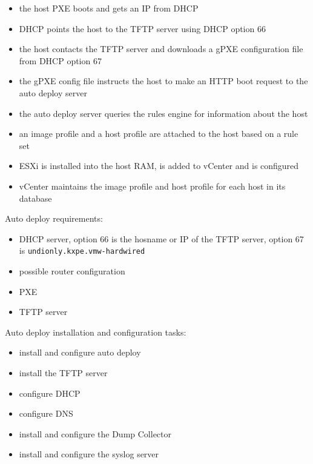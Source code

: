 \begin{itemize}

\item the host PXE boots and gets an IP from DHCP

\item DHCP points the host to the TFTP server using DHCP option 66

\item the host contacts the TFTP server and downloads a gPXE configuration file
from DHCP option 67

\item the gPXE config file instructs the host to make an HTTP boot request to
the auto deploy server

\item the auto deploy server queries the rules engine for information about
the host

\item an image profile and a host profile are attached to the host based
on a rule set

\item ESXi is installed into the host RAM, is added to vCenter and is
configured

\item vCenter maintains the image profile and host profile for each host in
its database

\end{itemize}

Auto deploy requirements:

\begin{itemize}
\item DHCP server, option 66 is the hosname or IP of the TFTP server, option
67 is \texttt{undionly.kxpe.vmw-hardwired}
\item possible router configuration
\item PXE
\item TFTP server
\end{itemize}

Auto deploy installation and configuration tasks:

\begin{itemize}
\item install and configure auto deploy
\item install the TFTP server
\item configure DHCP
\item configure DNS
\item install and configure the Dump Collector
\item install and configure the syslog server
\end{itemize}

